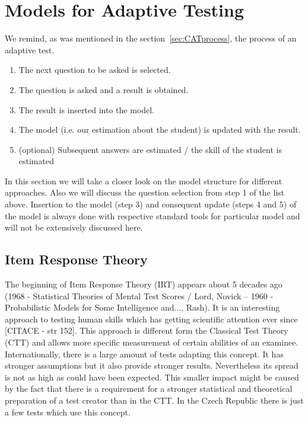 \chapter{Models for Adaptive Testing}


We remind, as was mentioned in the section~\ref{sec:CATprocess}, the process of an adaptive test.
\begin{enumerate}
	\item The next question to be asked is selected.
	\item The question is asked and a result is obtained.
	\item The result is inserted into the model.
	\item The model (i.e. our estimation about the student) is updated with the result.
	\item (optional) Subsequent answers are estimated / the skill of the student is estimated
\end{enumerate}
In this section we will take a closer look on the model structure for different approaches. Also we will discuss the question selection from step 1 of the list above. Insertion to the model (step 3) and consequent update (steps 4 and 5) of the model is always done with respective standard tools for particular model and will not be extensively discussed here.

\section{Item Response Theory}
\label{sec_IRT}
The beginning of Item Response Theory (IRT) appears about 5 decades ago (1968 - Statistical Theories of Mental Test Scores / Lord, Novick -- 1960 - Probabilistic Models for Some Intelligence and..., Rash). It is an interesting approach to testing human skills which has getting scientific attention ever since [CITACE - str 152]. This approach is different form the Classical Test Theory (CTT) and allows more specific measurement of certain abilities of an examinee. Internationally, there is a large amount of tests adapting this concept. It has stronger assumptions but it also provide stronger results. Nevertheless its spread is not as high as could have been expected. This smaller impact might be caused by the fact that there is a requirement for a stronger statistical and theoretical preparation of a test creator than in the CTT. In the Czech Republic there is just a few tests which use this concept. 

